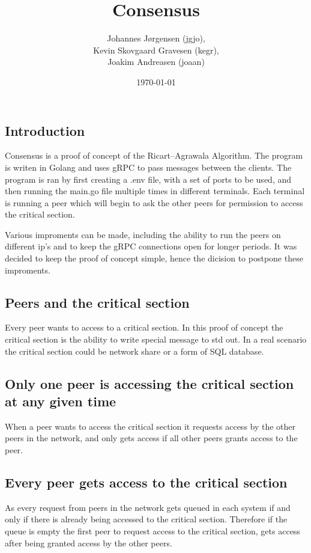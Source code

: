 \documentclass[a4paper,11pt]{article}
\title{Consensus}
\author{Johannes Jørgensen (jgjo),\\ Kevin Skovgaard Gravesen (kegr),\\ Joakim Andreasen (joaan)}
\date{\today}
\begin{document}
 

\maketitle

\subsection*{Introduction}
Consensus is a proof of concept of the Ricart–Agrawala Algorithm. The program is writen in Golang and uses gRPC to pass messages between the clients.
The program is ran by first creating a .env file, with a set of ports to be used, and then running the main.go file multiple times in different terminals.
Each terminal is running a peer which will begin to ask the other peers for permission to access the critical section.

Various improments can be made, including the ability to run the peers on different ip's and to keep the gRPC connections open for longer periods.
It was decided to keep the proof of concept simple, hence the dicision to postpone these improments.

\subsection*{Peers and the critical section}
Every peer wants to access to a critical section. In this proof of concept the critical section is the ability to write special message to std out.
In a real scenario the critical section could be network share or a form of SQL database.

\subsection*{Only one peer is accessing the critical section at any given time}
When a peer wants to access the critical section it requests access by the other peers in the network, and only gets access if all other peers grants access to the peer.


\subsection*{Every peer gets access to the critical section}
As every request from peers in the network gets queued in each system if and only if there is already being accessed to the critical section. 
Therefore if the queue is empty the first peer to request access to the critical section, gets access after being granted access by the other peers.
\end{document}
